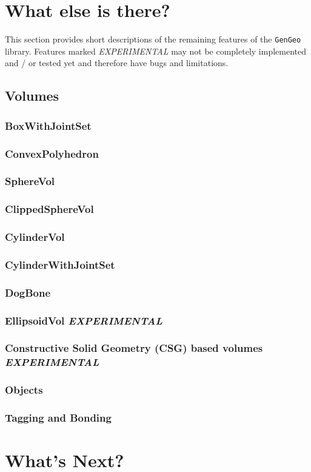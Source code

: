 \section{What else is there?}
This section provides short descriptions of the remaining features of the \texttt{GenGeo} library. Features marked \textit{EXPERIMENTAL} may not be completely implemented and / or tested yet and therefore have bugs and limitations.   
 
\subsection{Volumes}
\subsubsection*{BoxWithJointSet}
\subsubsection*{ConvexPolyhedron}
\subsubsection*{SphereVol}
\subsubsection*{ClippedSphereVol}
\subsubsection*{CylinderVol}
\subsubsection*{CylinderWithJointSet}
\subsubsection*{DogBone}
\subsubsection*{EllipsoidVol \textit{EXPERIMENTAL}}
\subsubsection*{Constructive Solid Geometry (CSG) based volumes \textit{EXPERIMENTAL}}
\subsubsection{Objects}
\subsubsection{Tagging and Bonding}
\section*{What's Next?}